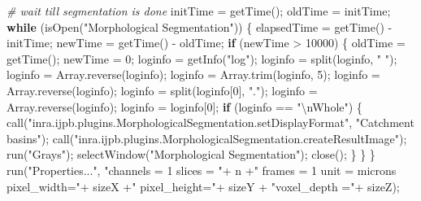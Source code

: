 \documentclass[10pt, b5paper, singlespacinge, twoside]{reedthesis} %
\newenvironment{Shaded}{}{}
\newcommand{\CommentTok}[1]{\textit{#1}}
\newcommand{\ControlFlowTok}[1]{\textbf{#1}}
\newcommand{\DecValTok}[1]{#1}
\newcommand{\FunctionTok}[1]{#1}
\newcommand{\NormalTok}[1]{#1}
\newcommand{\OtherTok}[1]{#1}
\newcommand{\SpecialCharTok}[1]{#1}
\newcommand{\StringTok}[1]{#1}
\theoremstyle{definition}
\theoremstyle{definition}
\theoremstyle{definition}
\theoremstyle{remark}
\begin{document}
\begin{Shaded}
\begin{Highlighting}[numbers=left,,]
\CommentTok{\# wait till segmentation is done}
\NormalTok{    initTime }\OtherTok{=} \FunctionTok{getTime}\NormalTok{(); }
\NormalTok{  oldTime }\OtherTok{=}\NormalTok{ initTime; }
    \ControlFlowTok{while}\NormalTok{ (}\FunctionTok{isOpen}\NormalTok{(}\StringTok{"Morphological Segmentation"}\NormalTok{)) \{}
\NormalTok{      elapsedTime }\OtherTok{=} \FunctionTok{getTime}\NormalTok{() }\SpecialCharTok{{-}}\NormalTok{ initTime; }
\NormalTok{        newTime }\OtherTok{=} \FunctionTok{getTime}\NormalTok{() }\SpecialCharTok{{-}}\NormalTok{ oldTime;}
        \ControlFlowTok{if}\NormalTok{ (newTime }\SpecialCharTok{\textgreater{}} \DecValTok{10000}\NormalTok{) \{}
\NormalTok{        oldTime }\OtherTok{=} \FunctionTok{getTime}\NormalTok{(); }
\NormalTok{        newTime }\OtherTok{=} \DecValTok{0}\NormalTok{;}
\NormalTok{        loginfo }\OtherTok{=} \FunctionTok{getInfo}\NormalTok{(}\StringTok{"log"}\NormalTok{);}
\NormalTok{            loginfo }\OtherTok{=} \FunctionTok{split}\NormalTok{(loginfo, }\StringTok{" "}\NormalTok{);}
\NormalTok{            loginfo }\OtherTok{=} \FunctionTok{Array.reverse}\NormalTok{(loginfo);}
\NormalTok{            loginfo }\OtherTok{=} \FunctionTok{Array.trim}\NormalTok{(loginfo, }\DecValTok{5}\NormalTok{);}
\NormalTok{            loginfo }\OtherTok{=} \FunctionTok{Array.reverse}\NormalTok{(loginfo);}
\NormalTok{            loginfo }\OtherTok{=} \FunctionTok{split}\NormalTok{(loginfo[}\DecValTok{0}\NormalTok{], }\StringTok{"."}\NormalTok{);}
\NormalTok{            loginfo }\OtherTok{=} \FunctionTok{Array.reverse}\NormalTok{(loginfo);}
\NormalTok{            loginfo }\OtherTok{=}\NormalTok{ loginfo[}\DecValTok{0}\NormalTok{];}
            \ControlFlowTok{if}\NormalTok{ (loginfo }\SpecialCharTok{==} \StringTok{"}\SpecialCharTok{\textbackslash{}n}\StringTok{Whole"}\NormalTok{) \{}
                \FunctionTok{call}\NormalTok{(}\StringTok{"inra.ijpb.plugins.MorphologicalSegmentation.setDisplayFormat"}\NormalTok{, }\StringTok{"Catchment basins"}\NormalTok{);}
                \FunctionTok{call}\NormalTok{(}\StringTok{"inra.ijpb.plugins.MorphologicalSegmentation.createResultImage"}\NormalTok{);}
                \FunctionTok{run}\NormalTok{(}\StringTok{"Grays"}\NormalTok{);}
                \FunctionTok{selectWindow}\NormalTok{(}\StringTok{"Morphological Segmentation"}\NormalTok{);}
                \FunctionTok{close}\NormalTok{();}
\NormalTok{            \}}
\NormalTok{    \}}
\NormalTok{    \}}
  \FunctionTok{run}\NormalTok{(}\StringTok{"Properties..."}\NormalTok{, }\StringTok{"channels = 1 slices = "}\SpecialCharTok{+}\NormalTok{ n }\SpecialCharTok{+}\StringTok{" frames = 1 unit = microns pixel\_width="}\SpecialCharTok{+} 
\NormalTok{        sizeX }\SpecialCharTok{+}\StringTok{" pixel\_height="}\SpecialCharTok{+}\NormalTok{ sizeY }\SpecialCharTok{+} \StringTok{"voxel\_depth ="}\SpecialCharTok{+}\NormalTok{ sizeZ);}
\end{Highlighting}
\end{Shaded}
\normalsize
\end{document}
